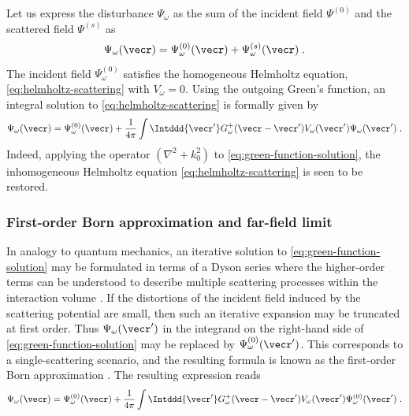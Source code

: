 \documentclass[
twoside,
openright,
titlepage,
numbers=noenddot,
headinclude,
fleqn,
a4paper,
footinclude=true,
cleardoublepage=empty,
abstractoff,
BCOR=5mm,
paper=a4,
fontsize=11pt,
british,ngerman,american,
]{scrreprt}
\begin{document}
Let us express the disturbance $\Psi_\omega$ as the sum of the
incident field $\Psi^{(0)}$ and the scattered field $\Psi^{(s)}$ as
\begin{equation}
  \Psi_\omega(\vecr) = \Psi^{(0)}_\omega(\vecr) + \Psi^{(s)}_\omega(\vecr) \;.
\end{equation}
The incident field $\Psi_{\omega}^{(0)}$ satisfies the homogeneous
Helmholtz equation, \ie{} \cref{eq:helmholtz-scattering} with
$V_\omega=0$.  Using the outgoing Green's function, an integral
solution to \cref{eq:helmholtz-scattering} is formally given by
\begin{equation}
  \label{eq:green-function-solution}
  \Psi_{\omega}(\vecr) = \Psi_{\omega}^{(0)}(\vecr) 
  +\frac{1}{4\pi}\int\Intddd{\vecr'}
  G^+_{\omega}(\vecr-\vecr')V_{\omega}(\vecr')\Psi_\omega(\vecr') \;.
\end{equation}
Indeed, applying the operator $\left(\nabla^2 + k_0^2\right)$ to
\cref{eq:green-function-solution}, the inhomogeneous Helmholtz
equation \eqref{eq:helmholtz-scattering} is seen to be restored.  




\subsubsection{First-order Born approximation and far-field limit}
\label{sec:first-order-born-approximation}

In analogy to quantum mechanics, an iterative solution to
\cref{eq:green-function-solution} may be formulated in terms of a
Dyson series where the higher-order terms can be understood to
describe multiple scattering processes within the interaction volume
\cite{Sakurai}.  If the distortions of the incident field induced by
the scattering potential are small, then such an iterative expansion
may be truncated at first order.  Thus $\Psi_\omega(\vecr')$ in the
integrand on the right-hand side of \cref{eq:green-function-solution}
may be replaced by $\Psi^{(0)}_\omega(\vecr')$.  This corresponds to a
single-scattering scenario, and the resulting formula is known as the
first-order Born approximation \cite{Born1926a,Born1926b}.  The
resulting expression reads 
\begin{equation}
  \label{eq:first-born}
  \Psi_{\omega}(\vecr) = \Psi_{\omega}^{(0)}(\vecr) 
  +\frac{1}{4\pi}\int\Intddd{\vecr'}
  G^+_{\omega}(\vecr-\vecr')V_{\omega}(\vecr')\Psi^{(0)}_\omega(\vecr') \;.
\end{equation}
\end{document}
